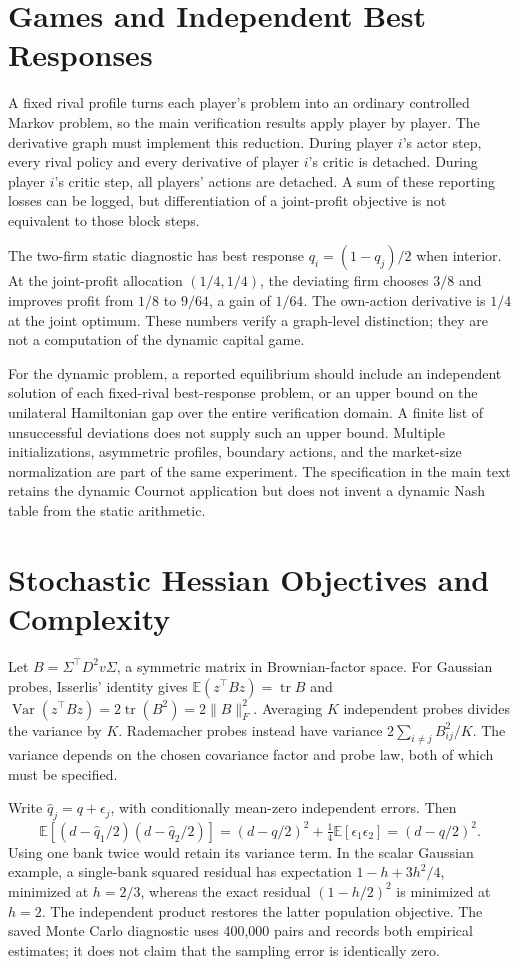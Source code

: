 \documentclass[ecta,draft]{econsocart}
\newcommand{\E}{\mathbb E}
\newcommand{\tr}{\operatorname{tr}}
\begin{document}
\section{Games and Independent Best Responses}
A fixed rival profile turns each player's problem into an ordinary controlled Markov problem, so the main verification results apply player by player. The derivative graph must implement this reduction. During player $i$'s actor step, every rival policy and every derivative of player $i$'s critic is detached. During player $i$'s critic step, all players' actions are detached. A sum of these reporting losses can be logged, but differentiation of a joint-profit objective is not equivalent to those block steps.

The two-firm static diagnostic has best response $q_i=(1-q_j)/2$ when interior. At the joint-profit allocation $(1/4,1/4)$, the deviating firm chooses $3/8$ and improves profit from $1/8$ to $9/64$, a gain of $1/64$. The own-action derivative is $1/4$ at the joint optimum. These numbers verify a graph-level distinction; they are not a computation of the dynamic capital game.

For the dynamic problem, a reported equilibrium should include an independent solution of each fixed-rival best-response problem, or an upper bound on the unilateral Hamiltonian gap over the entire verification domain. A finite list of unsuccessful deviations does not supply such an upper bound. Multiple initializations, asymmetric profiles, boundary actions, and the market-size normalization are part of the same experiment. The specification in the main text retains the dynamic Cournot application but does not invent a dynamic Nash table from the static arithmetic.

\section{Stochastic Hessian Objectives and Complexity}
Let $B=\Sigma^\top D^2v\Sigma$, a symmetric matrix in Brownian-factor space. For Gaussian probes, Isserlis' identity gives $\E(z^\top Bz)=\tr B$ and $\operatorname{Var}(z^\top Bz)=2\tr(B^2)=2\|B\|_F^2$. Averaging $K$ independent probes divides the variance by $K$. Rademacher probes instead have variance $2\sum_{i\ne j}B_{ij}^2/K$. The variance depends on the chosen covariance factor and probe law, both of which must be specified.

Write $\widehat q_j=q+\epsilon_j$, with conditionally mean-zero independent errors. Then
\[
 \E[(d-\widehat q_1/2)(d-\widehat q_2/2)]
 =(d-q/2)^2+\tfrac14\E[\epsilon_1\epsilon_2]=(d-q/2)^2.
\]
Using one bank twice would retain its variance term. In the scalar Gaussian example, a single-bank squared residual has expectation $1-h+3h^2/4$, minimized at $h=2/3$, whereas the exact residual $(1-h/2)^2$ is minimized at $h=2$. The independent product restores the latter population objective. The saved Monte Carlo diagnostic uses 400,000 pairs and records both empirical estimates; it does not claim that the sampling error is identically zero.
\end{document}
